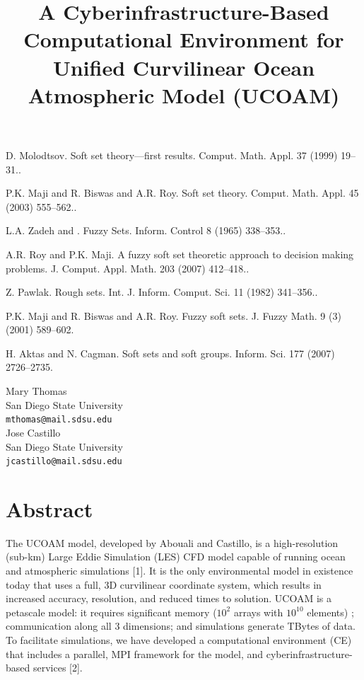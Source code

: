 \documentclass[article,A4,11pt]{llncs}%
\begin{document}

\begin{thebibliography}{10}
{\sc D. Molodtsov}. {Soft set theory—first results}. Comput. Math. Appl. 37 (1999) 19–31..

{\sc P.K. Maji and R. Biswas and A.R. Roy}. { Soft set theory}. Comput. Math. Appl. 45 (2003) 555–562..

{\sc L.A. Zadeh and  }. {Fuzzy Sets}. Inform. Control 8 (1965) 338–353..

{\sc A.R. Roy and P.K. Maji}. {A fuzzy soft set theoretic approach to decision making problems}. J. Comput. Appl. Math. 203 (2007) 412–418..

{\sc Z. Pawlak}. {Rough sets}. Int. J. Inform. Comput. Sci. 11 (1982) 341–356..

{\sc P.K. Maji and R. Biswas and A.R. Roy}. { Fuzzy soft sets}.  J. Fuzzy Math. 9 (3) (2001) 589–602.

{\sc H. Aktas and N. Cagman}. {Soft sets and soft groups}. Inform. Sci. 177 (2007) 2726–2735.
\end{thebibliography}

\title{A Cyberinfrastructure-Based Computational Environment for Unified Curvilinear Ocean Atmospheric Model  (UCOAM)}
 \author{} \institute{}
\maketitle
\begin{center}
{\large Mary  Thomas}\\
San Diego State University\\
{\tt mthomas@mail.sdsu.edu}
\\ \vspace{4mm}
{\large Jose Castillo}\\
San Diego State University\\
{\tt jcastillo@mail.sdsu.edu}
\end{center}

\section*{Abstract}
The UCOAM model, developed by Abouali and Castillo, is a high-resolution (sub-km) Large Eddie Simulation (LES) CFD model capable of running  ocean and atmospheric simulations [1]. It is the only environmental model in existence today that uses a full, 3D curvilinear coordinate system, which results in increased accuracy, resolution, and reduced times to solution. UCOAM is a petascale model: it requires significant memory ($10^{2}$ arrays with $10^{10}$ elements) ; communication  along all 3 dimensions; and simulations generate TBytes of data. To facilitate simulations, we have developed a computational environment (CE) that includes a parallel, MPI framework for the model, and cyberinfrastructure-based services [2].
\end{document}
